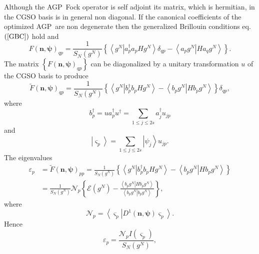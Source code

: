 \documentclass[aps,preprint]{revtex4}%
\begin{document}
Although the AGP\ Fock operator is self adjoint its matrix, which is
hermitian, in the CGSO basis is in general non diagonal. If the canonical
coefficients of the optimized AGP\ are non degenerate then the generalized
Brillouin conditions eq. $\left(  \ref{GBC}\right)  $ hold and
\begin{equation}
F\left(  \mathbf{n},\mathbf{\psi}\right)  _{qp}=\frac{1}{S_{N}\left(
g^{N}\right)  }\left\{  \left\langle \left.  g^{N}\right\vert a_{p}^{\dagger
}a_{p}Hg^{N}\right\rangle \delta_{qp}-\left\langle \left.  a_{p}%
g^{N}\right\vert Ha_{q}g^{N}\right\rangle \right\}  .
\end{equation}
The matrix $\left\{  F\left(  \mathbf{n},\mathbf{\psi}\right)  _{qp}\right\}
$ can be diagonalized by a unitary transformation $u$ of the CGSO basis to
produce
\begin{equation}
\tilde{F}\left(  \mathbf{n},\mathbf{\psi}\right)  _{qp}=\frac{1}{S_{N}\left(
g^{N}\right)  }\left\{  \left\langle \left.  g^{N}\right\vert b_{p}^{\dagger
}b_{p}Hg^{N}\right\rangle -\left\langle \left.  b_{p}g^{N}\right\vert
Hb_{p}g^{N}\right\rangle \right\}  \delta_{qp},
\end{equation}
where
\begin{equation}
b_{p}^{\dagger}=ua_{p}^{\dagger}u^{\dagger}=\sum_{1\leq j\leq2s}a_{j}%
^{\dagger}u_{jp}%
\end{equation}
and
\begin{equation}
\left\vert \varsigma_{p}\right\rangle =\sum_{1\leq j\leq2s}\left\vert \psi
_{j}\right\rangle u_{jp}.
\end{equation}
The eigenvalues
\begin{align}
\varepsilon_{p}  &  =\tilde{F}\left(  \mathbf{n},\mathbf{\psi}\right)
_{pp}=\frac{1}{S_{N}\left(  g^{N}\right)  }\left\{  \left\langle \left.
g^{N}\right\vert b_{p}^{\dagger}b_{p}Hg^{N}\right\rangle -\left\langle \left.
b_{p}g^{N}\right\vert Hb_{p}g^{N}\right\rangle \right\} \nonumber\\
&  =\frac{1}{S_{N}\left(  g^{N}\right)  }\mathcal{N}_{p}\left\{
\mathcal{E}\left(  g^{N}\right)  -\frac{\left\langle \left.  b_{p}%
g^{N}\right\vert Hb_{p}g^{N}\right\rangle }{\left\langle \left.  b_{p}%
g^{N}\right\vert b_{p}g^{N}\right\rangle }\right\}  ,
\end{align}
where
\begin{equation}
\mathcal{N}_{p}=\left\langle \left.  \varsigma_{p}\right\vert D^{1}\left(
\mathbf{n},\mathbf{\psi}\right)  \varsigma_{p}\right\rangle .
\end{equation}
Hence
\begin{equation}
\varepsilon_{p}=\frac{\mathcal{N}_{p}I\left(  \varsigma_{p}\right)  }%
{S_{N}\left(  g^{N}\right)  },
\end{equation}
\end{document}
